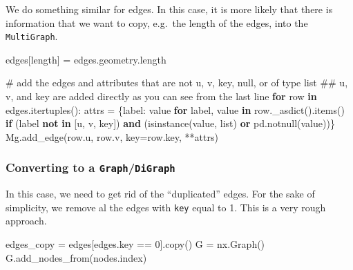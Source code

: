 \documentclass[
  letterpaper,
  DIV=11,
  numbers=noendperiod]{scrreprt}
\newenvironment{Shaded}{\begin{snugshade}}{\end{snugshade}}
\newcommand{\BuiltInTok}[1]{\textcolor[rgb]{0.00,0.23,0.31}{#1}}
\newcommand{\CommentTok}[1]{\textcolor[rgb]{0.37,0.37,0.37}{#1}}
\newcommand{\ControlFlowTok}[1]{\textcolor[rgb]{0.00,0.23,0.31}{\textbf{#1}}}
\newcommand{\DecValTok}[1]{\textcolor[rgb]{0.68,0.00,0.00}{#1}}
\newcommand{\KeywordTok}[1]{\textcolor[rgb]{0.00,0.23,0.31}{\textbf{#1}}}
\newcommand{\NormalTok}[1]{\textcolor[rgb]{0.00,0.23,0.31}{#1}}
\newcommand{\OperatorTok}[1]{\textcolor[rgb]{0.37,0.37,0.37}{#1}}
\newcommand{\StringTok}[1]{\textcolor[rgb]{0.13,0.47,0.30}{#1}}
\begin{document}
We do something similar for edges. In this case, it is more likely that
there is information that we want to copy, e.g.~the length of the edges,
into the \texttt{MultiGraph}.

\begin{Shaded}
\begin{Highlighting}[]
\NormalTok{edges[}\StringTok{\textquotesingle{}length\textquotesingle{}}\NormalTok{] }\OperatorTok{=}\NormalTok{ edges.geometry.length}

\CommentTok{\# add the edges and attributes that are not u, v, key, null, or of type list}
\CommentTok{\#\# u, v, and key are added directly as you can see from the last line}
\ControlFlowTok{for}\NormalTok{ row }\KeywordTok{in}\NormalTok{ edges.itertuples():}
\NormalTok{    attrs }\OperatorTok{=}\NormalTok{ \{label: value }\ControlFlowTok{for}\NormalTok{ label, value }\KeywordTok{in}\NormalTok{ row.\_asdict().items() }\ControlFlowTok{if}\NormalTok{ (label }\KeywordTok{not} \KeywordTok{in}\NormalTok{ [}\StringTok{\textquotesingle{}u\textquotesingle{}}\NormalTok{, }\StringTok{\textquotesingle{}v\textquotesingle{}}\NormalTok{, }\StringTok{\textquotesingle{}key\textquotesingle{}}\NormalTok{]) }\KeywordTok{and} 
\NormalTok{             (}\BuiltInTok{isinstance}\NormalTok{(value, }\BuiltInTok{list}\NormalTok{) }\KeywordTok{or}\NormalTok{ pd.notnull(value))\}}
\NormalTok{    Mg.add\_edge(row.u, row.v, key}\OperatorTok{=}\NormalTok{row.key, }\OperatorTok{**}\NormalTok{attrs)}
\end{Highlighting}
\end{Shaded}

\subsubsection{\texorpdfstring{Converting to a
\texttt{Graph}/\texttt{DiGraph}}{Converting to a Graph/DiGraph}}\label{converting-to-a-graphdigraph}

In this case, we need to get rid of the ``duplicated'' edges. For the
sake of simplicity, we remove al the edges with \texttt{key} equal to 1.
This is a very rough approach.

\begin{Shaded}
\begin{Highlighting}[]
\NormalTok{edges\_copy }\OperatorTok{=}\NormalTok{ edges[edges.key }\OperatorTok{==} \DecValTok{0}\NormalTok{].copy()}
\NormalTok{G }\OperatorTok{=}\NormalTok{ nx.Graph()   }
\NormalTok{G.add\_nodes\_from(nodes.index)}
\end{Highlighting}
\end{Shaded}
\end{document}
